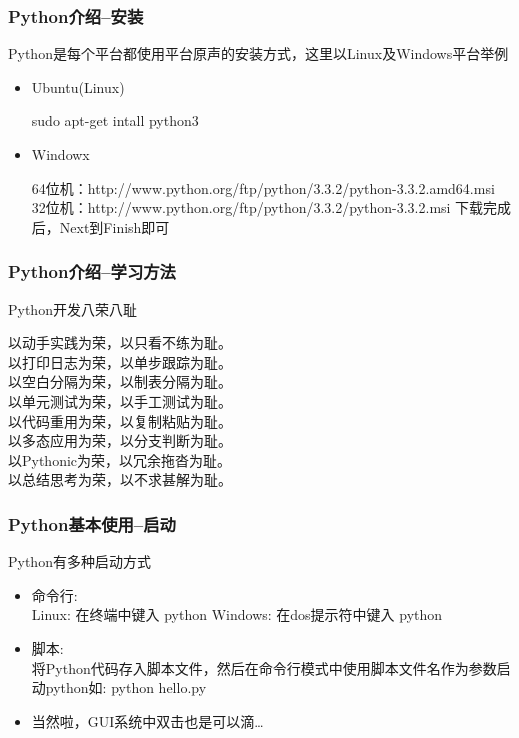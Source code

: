 \documentclass[xcolor=dvipsnames]{beamer}
\begin{document}
\begin{frame}
    \frametitle{Python介绍--安装}
    Python是每个平台都使用平台原声的安装方式，这里以Linux及Windows平台举例
    \begin{itemize}[<+->]
        \item
            Ubuntu(Linux)
            
            sudo apt-get intall python3 
        \item
            Windowx

            64位机：http://www.python.org/ftp/python/3.3.2/python-3.3.2.amd64.msi
            32位机：http://www.python.org/ftp/python/3.3.2/python-3.3.2.msi
            下载完成后，Next到Finish即可
    \end{itemize} 
\end{frame}

\begin{frame}
    \frametitle{Python介绍--学习方法}
    Python开发\alert{八荣八耻}\\
    \begin{center}
        \pause
        以动手实践为荣，以只看不练为耻。\\
        \pause
        以打印日志为荣，以单步跟踪为耻。\\
        \pause
        以空白分隔为荣，以制表分隔为耻。\\
        \pause
        以单元测试为荣，以手工测试为耻。\\
        \pause
        以代码重用为荣，以复制粘贴为耻。\\
        \pause
        以多态应用为荣，以分支判断为耻。\\
        \pause
        以Pythonic为荣，以冗余拖沓为耻。\\
        \pause 
        以总结思考为荣，以不求甚解为耻。\\
    \end{center}
\end{frame}

\begin{frame}
    \frametitle{Python基本使用--启动}
    Python有多种启动方式
    \begin{itemize}[<+->]
        \item 命令行:\\
            Linux:   在终端中键入 python
            Windows: 在dos提示符中键入 python
        \item 脚本:\\
            将Python代码存入脚本文件，然后在命令行模式中使用脚本文件名作为参数启动python如: python hello.py
        \item 当然啦，GUI系统中双击也是可以滴\ldots
    \end{itemize} 
\end{frame}
\end{document}
